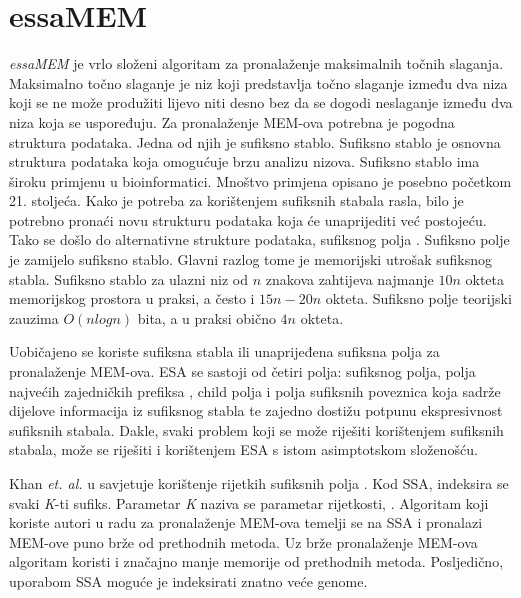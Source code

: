 \documentclass[times, utf8, seminar, numeric]{fer}
\begin{document}
\chapter{essaMEM}

\textit{essaMEM} je vrlo složeni algoritam za pronalaženje maksimalnih točnih slaganja. Maksimalno točno slaganje  je niz koji predstavlja točno slaganje između dva niza koji se ne može produžiti lijevo niti desno bez da se dogodi neslaganje između dva niza koja se uspoređuju. Za pronalaženje MEM-ova potrebna je pogodna struktura podataka. Jedna od njih je sufiksno stablo. Sufiksno stablo je osnovna struktura podataka koja omogućuje brzu analizu nizova. Sufiksno stablo ima široku primjenu u bioinformatici. Mnoštvo primjena opisano je posebno početkom 21. stoljeća. Kako je potreba za korištenjem sufiksnih stabala rasla, bilo je potrebno pronaći novu strukturu podataka koja će unaprijediti već postojeću. Tako se došlo do alternativne strukture podataka, sufiksnog polja . Sufiksno polje je zamijelo sufiksno stablo. Glavni razlog tome je memorijski utrošak sufiksnog stabla. Sufiksno stablo za ulazni niz od $n$ znakova zahtijeva najmanje $10n$ okteta memorijskog prostora u praksi, a često i $15n-20n$ okteta. Sufiksno polje teorijski zauzima $O(n log n)$ bita, a u praksi obično $4n$ okteta.

Uobičajeno se koriste sufiksna stabla ili unaprijeđena sufiksna polja  za pronalaženje MEM-ova. ESA se sastoji od četiri polja: sufiksnog polja, polja najvećih zajedničkih prefiksa , child polja i polja sufiksnih poveznica  koja sadrže dijelove informacija iz sufiksnog stabla te zajedno dostižu potpunu ekspresivnost sufiksnih stabala. Dakle, svaki problem koji se može riješiti korištenjem sufiksnih stabala, može se riješiti i korištenjem ESA s istom asimptotskom složenošću.

Khan \textit{et. al.} u \cite{ssa} savjetuje korištenje rijetkih sufiksnih polja . Kod SSA, indeksira se svaki \textit{K}-ti sufiks. Parametar \textit{K} naziva se parametar rijetkosti, . Algoritam koji koriste autori u radu \cite{ssa} za pronalaženje MEM-ova temelji se na SSA i pronalazi MEM-ove puno brže od prethodnih metoda. Uz brže pronalaženje MEM-ova algoritam koristi i značajno manje memorije od prethodnih metoda. Posljedično, uporabom SSA moguće je indeksirati znatno veće genome.
\end{document}
